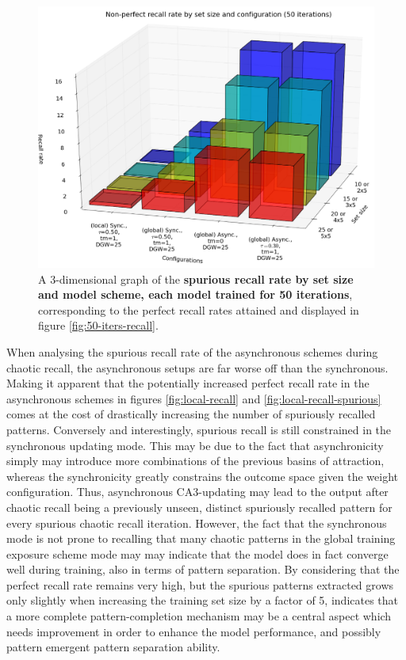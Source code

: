 \begin{figure}
    \centering
    \includegraphics[width=13cm]{fig/i-iters/50-iters-recall-spurious}
    \caption{A 3-dimensional graph of the \textbf{spurious recall rate by set size and model scheme, each model trained for 50 iterations}, corresponding to the perfect recall rates attained and displayed in figure \ref{fig:50-iters-recall}.}
    \label{fig:50-iters-recall-spurious}
\end{figure}

When analysing the spurious recall rate of the asynchronous schemes during chaotic recall, the asynchronous setups are far worse off than the synchronous. Making it apparent that the potentially increased perfect recall rate in the asynchronous schemes in figures \ref{fig:local-recall} and \ref{fig:local-recall-spurious} comes at the cost of drastically increasing the number of spuriously recalled patterns. Conversely and interestingly, spurious recall is still constrained in the synchronous updating mode. This may be due to the fact that asynchronicity simply may introduce more combinations of the previous basins of attraction, whereas the synchronicity greatly constrains the outcome space given the weight configuration. Thus, asynchronous CA3-updating may lead to the output after chaotic recall being a previously unseen, distinct spuriously recalled pattern for every spurious chaotic recall iteration. However, the fact that the synchronous mode is not prone to recalling that many chaotic patterns in the global training exposure scheme mode may may indicate that the model does in fact converge well during training, also in terms of pattern separation. By considering that the perfect recall rate remains very high, but the spurious patterns extracted grows only slightly when increasing the training set size by a factor of 5, indicates that a more complete pattern-completion mechanism may be a central aspect which needs improvement in order to enhance the model performance, and possibly pattern emergent pattern separation ability.

